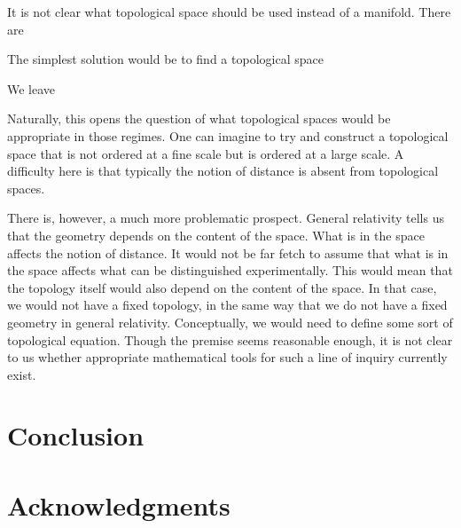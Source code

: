 \documentclass[12pt]{iopart}
\begin{document}
It is not clear what topological space should be used instead of a manifold. There are 

The simplest solution would be to find a topological space 

We leave

Naturally, this opens the question of what topological spaces would be appropriate in those regimes. One can imagine to try and construct a topological space that is not ordered at a fine scale but is ordered at a large scale. A difficulty here is that typically the notion of distance is absent from topological spaces.

There is, however, a much more problematic prospect. General relativity tells us that the geometry depends on the content of the space. What is in the space affects the notion of distance. It would not be far fetch to assume that what is in the space affects what can be distinguished experimentally. This would mean that the topology itself would also depend on the content of the space. In that case, we would not have a fixed topology, in the same way that we do not have a fixed geometry in general relativity. Conceptually, we would need to define some sort of topological equation. Though the premise seems reasonable enough, it is not clear to us whether appropriate mathematical tools for such a line of inquiry currently exist.

\section{Conclusion}

\section*{Acknowledgments}
\end{document}
